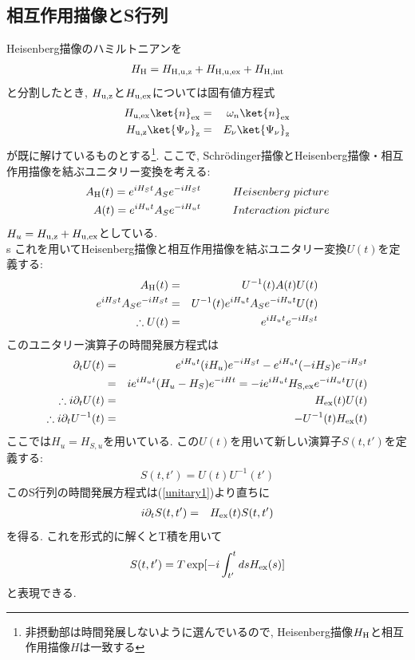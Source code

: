 \documentclass[10.5pt,a4paper]{jreport}
\begin{document}
\subsection{相互作用描像とS行列}
Heisenberg描像のハミルトニアンを
\begin{eqnarray}
  H_{\rm H} = H_{\rm H, u, z} + H_{\rm H, u, ex} + H_{\rm H, \rm int}
\end{eqnarray}
と分割したとき, $H_{\rm u, z}$と$H_{\rm u, ex}$については固有値方程式
\begin{eqnarray}
  H_{\rm u, ex}\ket{n}_{\rm ex} &=& \omega_n\ket{n}_{\rm ex}\\
  H_{\rm u, z}\ket{\Psi_\nu}_{\rm z} &=& E_\nu\ket{\Psi_\nu}_{\rm z}
\end{eqnarray}
が既に解けているものとする\footnote{非摂動部は時間発展しないように選んでいるので, Heisenberg描像$H_{\rm H}$と相互作用描像$H$は一致する}.
ここで, Schr\"odinger描像とHeisenberg描像・相互作用描像を結ぶユニタリー変換を考える:
\begin{eqnarray}
  A_{\rm H}(t) = e^{iH_St}A_Se^{-iH_St}\hspace{1.0cm} &Heisenberg\ picture\label{picture1}\\
  A(t) = e^{iH_ut}A_Se^{-iH_ut}\hspace{1.0cm} &Interaction\ picture\label{picture2}
\end{eqnarray}
$H_u = H_{\rm u, z} + H_{\rm u, ex}$としている.\\
s
これを用いてHeisenberg描像と相互作用描像を結ぶユニタリー変換$U(t)$を定義する:
\begin{eqnarray}
  A_{\rm H}(t) &=& U^{-1}(t)A(t)U(t)\\
  e^{iH_St}A_Se^{-iH_St} &=& U^{-1}(t)e^{iH_ut}A_Se^{-iH_ut}U(t)\\
  \therefore U(t) &=& e^{iH_ut}e^{-iH_St}
\end{eqnarray}
このユニタリー演算子の時間発展方程式は
\begin{eqnarray}
  \nonumber  \partial_tU(t) &=& e^{iH_ut}(iH_u)e^{-iH_St} -e^{iH_ut}(-iH_S)e^{-iH_St}\\
  &=& ie^{iH_ut}(H_u - H_S)e^{-iHt} = -ie^{iH_ut}H_{\rm S, ex}e^{-iH_ut}U(t)\\
  \therefore i\partial_tU(t) &=& H_{\rm ex}(t)U(t)\label{unitary1}\\
  \therefore i\partial_tU^{-1}(t) &=& -U^{-1}(t)H_{\rm ex}(t)\label{unitary2}
\end{eqnarray}
ここでは$H_u = H_{S, u}$を用いている. この$U(t)$を用いて新しい演算子$S(t, t')$を定義する:
\begin{eqnarray}
  S(t, t') = U(t)U^{-1}(t')
\end{eqnarray}
このS行列の時間発展方程式は(\ref{unitary1})より直ちに
\begin{eqnarray}
  i\partial_tS(t, t') &=& H_{\rm ex}(t)S(t, t')
\end{eqnarray}
を得る. これを形式的に解くとT積を用いて
\begin{eqnarray}
  S(t, t') = T\exp[-i\int_{t'}^{t}ds H_{\rm ex}(s)]
\end{eqnarray}
と表現できる.
\end{document}
